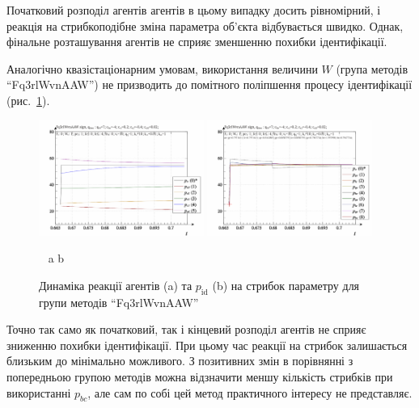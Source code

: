 Початковий розподіл агентів агентів в цьому випадку досить
рівномірний, і реакція на стрибкоподібне зміна параметра об'єкта
відбувається швидко. Однак, фінальне розташування агентів не
сприяє зменшенню похибки ідентифікації.

Аналогічно квазістаціонарним умовам, використання величини
$W$ (група методів ``Fq3rlWvnAAW'') не призводить до помітного
поліпшення процесу ідентифікації (рис.~\ref{atu:f:Fq3rlWvnAAW_sign}).

\begin{figure}[htb!]
  \begin{center}
    \includegraphics[width=0.48\textwidth]{p/sign/qls-p_t_pi_m_Fq3rlWvnAAW_sign.png}
    \hfill
    \includegraphics[width=0.48\textwidth]{p/sign/qls-p_t_p_m_Fq3rlWvnAAW_sign.png}
  \end{center}
  \vspace{-1.0ex}
  \begin{center}
    ~ \hfill a \hfill\hfill b  \hfill ~
  \end{center}
  \vspace{-1.5ex}
  \caption{Динаміка реакції агентів (a) та $p_\mathrm{id}$ (b) на стрибок параметру для групи методів ``Fq3rlWvnAAW''}
  \label{atu:f:Fq3rlWvnAAW_sign}
\end{figure}

Точно так само як початковий, так і кінцевий розподіл агентів не
сприяє зниженню похибки ідентифікації. При цьому час реакції
на стрибок залишається близьким до мінімально можливого. З
позитивних змін в порівнянні з попередньою групою методів
можна відзначити меншу кількість стрибків при використанні
$p_{bc}$, але сам по собі цей метод практичного інтересу не
представляє.


